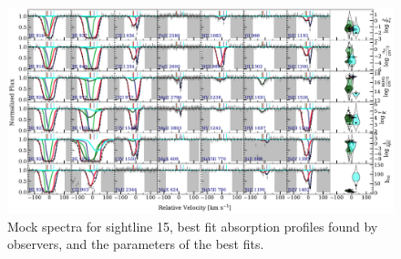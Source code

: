 \documentclass[fleqn,usenatbib]{mnras}
\begin{document}
\begin{figure}
    \centering
    \includegraphics[width=\textwidth]{figures/sample2/best_fits/0015.pdf}
    \caption{
    Mock spectra for sightline 15,
    best fit absorption profiles found by observers,
    and the parameters of the best fits.
    }
    \label{f: sample2 spectrum 15 appendix}
\end{figure}
\end{document}

